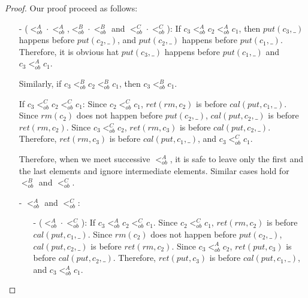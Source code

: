\documentclass{llncs}
\begin{document}
\begin {proof}

Our proof proceed as follows:

\begin{itemize}
\setlength{\itemsep}{0.5pt}
\item[-] ($<_{\textit{ob}}^A \cdot <_{\textit{ob}}^A$,$<_{\textit{ob}}^B \cdot <_{\textit{ob}}^B$ and $<_{\textit{ob}}^C \cdot <_{\textit{ob}}^C$): If $c_3 <_{\textit{ob}}^A c_2 <_{\textit{ob}}^A c_1$, then $\textit{put}(c_3,\_)$ happens before $\textit{put}(c_2,\_)$, and $\textit{put}(c_2,\_)$ happens before $\textit{put}(c_1,\_)$. Therefore, it is obvious hat $\textit{put}(c_3,\_)$ happens before $\textit{put}(c_1,\_)$ and $c_3 <_{\textit{ob}}^A c_1$.

    Similarly, if $c_3 <_{\textit{ob}}^B c_2 <_{\textit{ob}}^B c_1$, then $c_3 <_{\textit{ob}}^B c_1$.

    If $c_3 <_{\textit{ob}}^C c_2 <_{\textit{ob}}^C c_1$: Since $c_2 <_{\textit{ob}}^C c_1$, $\textit{ret}(\textit{rm},c_2)$ is before $\textit{cal}(\textit{put},c_1,\_)$. Since $\textit{rm}(c_2)$ does not happen before $\textit{put}(c_2,\_)$, $\textit{cal}(\textit{put},c_2,\_)$ is before $\textit{ret}(\textit{rm},c_2)$. Since $c_3 <_{\textit{ob}}^C c_2$, $\textit{ret}(\textit{rm},c_3)$ is before $\textit{cal}(\textit{put},c_2,\_)$. Therefore, $\textit{ret}(\textit{rm},c_3)$ is before $\textit{cal}(\textit{put},c_1,\_)$, and $c_3 <_{\textit{ob}}^C c_1$.

    Therefore, when we meet successive $<_{\textit{ob}}^A$, it is safe to leave only the first and the last elements and ignore intermediate elements. Similar cases hold for $<_{\textit{ob}}^B$ and $<_{\textit{ob}}^C$.

\item[-] $<_{\textit{ob}}^A$ and $<_{\textit{ob}}^C$:

    \begin{itemize}
    \setlength{\itemsep}{0.5pt}
    \item[-] ($<_{\textit{ob}}^A \cdot <_{\textit{ob}}^C$): If $c_3 <_{\textit{ob}}^A c_2 <_{\textit{ob}}^C c_1$. Since $c_2 <_{\textit{ob}}^C c_1$, $\textit{ret}(\textit{rm},c_2)$ is before $\textit{cal}(\textit{put},c_1,\_)$. Since $\textit{rm}(c_2)$ does not happen before $\textit{put}(c_2,\_)$, $\textit{cal}(\textit{put},c_2,\_)$ is before $\textit{ret}(\textit{rm},c_2)$. Since $c_3 <_{\textit{ob}}^A c_2$, $\textit{ret}(\textit{put},c_3)$ is before $\textit{cal}(\textit{put},c_2,\_)$. Therefore, $\textit{ret}(\textit{put},c_3)$ is before $\textit{cal}(\textit{put},c_1,\_)$, and $c_3 <_{\textit{ob}}^A c_1$.


\end{itemize}
\end{itemize}
\end{proof}
\end{document}
